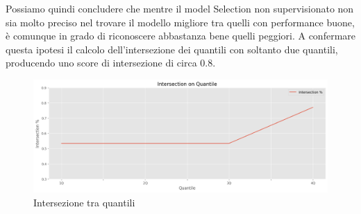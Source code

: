 Possiamo quindi concludere che mentre il model Selection non supervisionato non sia molto preciso nel trovare il modello migliore tra quelli con performance buone, è comunque in grado di riconoscere abbastanza bene quelli peggiori. A confermare questa ipotesi il calcolo dell'intersezione dei quantili con soltanto due quantili, producendo uno score di intersezione di circa \(0.8\).

\begin{figure}[t]
	\centering
	\includegraphics[width=14cm, scale=1]{images/4quantile}
	\caption{Intersezione tra quantili}
	\label{quantile-intersection}
		
\end{figure}

